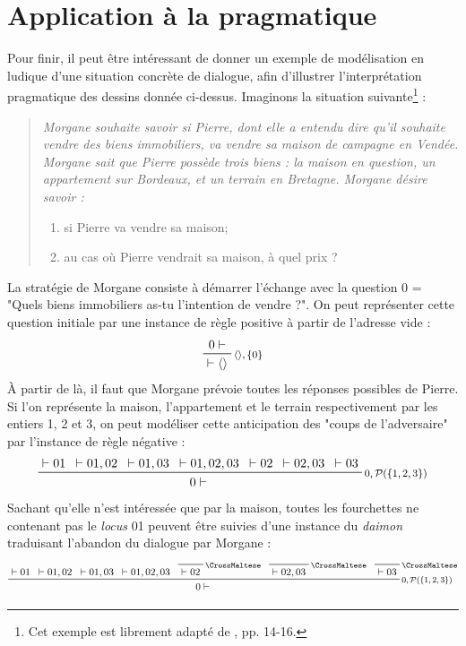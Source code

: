 \documentclass[11pt]{report}
\newcommand{\dai}{\text{\CrossMaltese}}
\newcommand{\seq}{\vdash}
\newcommand{\irule}[1]{\footnotesize$#1$}
\begin{document}
\section{Application à la pragmatique}

Pour finir, il peut être intéressant de donner un exemple de modélisation en ludique d'une situation concrète de dialogue, afin d'illustrer l'interprétation pragmatique des dessins donnée ci-dessus. Imaginons la situation suivante\footnote{Cet exemple est librement adapté de \cite{LQFD07}, pp. 14-16.} :
\begin{quote}
    \it
    Morgane souhaite savoir si Pierre, dont elle a entendu dire qu’il souhaite vendre des biens immobiliers, va vendre sa maison de campagne en Vendée. Morgane sait que Pierre possède trois biens : la maison en question, un appartement sur Bordeaux, et un terrain en Bretagne. Morgane désire savoir :
    \begin{enumerate}
        \item si Pierre va vendre sa maison;
        \item au cas où Pierre vendrait sa maison, à quel prix ?
    \end{enumerate}
\end{quote}
La stratégie de Morgane consiste à démarrer l'échange avec la question $0$ = "Quels biens immobiliers as-tu l'intention de vendre ?". On peut représenter cette question initiale par une instance de règle positive à partir de l'adresse vide :
\begin{displaymath}
    \prftree[r]{\irule{\langle\rangle,\{0\}}}
        {0 \seq}
        {\seq \langle\rangle}
\end{displaymath}
À partir de là, il faut que Morgane prévoie toutes les réponses possibles de Pierre. Si l'on représente la maison, l'appartement et le terrain respectivement par les entiers 1, 2 et 3, on peut modéliser cette anticipation des "coups de l'adversaire" par l'instance de règle négative :
\begin{displaymath}
    \prftree[r]{\irule{0,\mathcal{P}(\{1,2,3\})}}
        {\seq 01}
        {\seq 01,02}
        {\seq 01,03}
        {\seq 01,02,03}
        {\seq 02}
        {\seq 02,03}
        {\seq 03}
        {0 \seq}
\end{displaymath}
Sachant qu'elle n'est intéressée que par la maison, toutes les fourchettes ne contenant pas le \textit{locus} 01 peuvent être suivies d'une instance du \textit{daimon} traduisant l'abandon du dialogue par Morgane :
\begin{displaymath}
    \prftree[r]{\irule{0,\mathcal{P}(\{1,2,3\})}}
        {\seq 01}
        {\seq 01,02}
        {\seq 01,03}
        {\seq 01,02,03}
        {\prfbyaxiom{\irule{\dai}}{\seq 02}}
        {\prfbyaxiom{\irule{\dai}}{\seq 02,03}}
        {\prfbyaxiom{\irule{\dai}}{\seq 03}}
        {0 \seq}
\end{displaymath}
\end{document}
